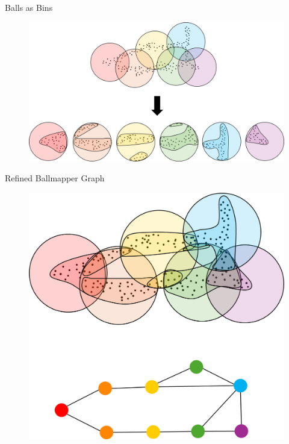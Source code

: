 \documentclass{beamer}
\begin{document}
\begin{frame}{Balls as Bins}
  \begin{figure}
    \begin{center}
      \hspace*{-.5cm}\includegraphics[width=1.1\textwidth]{ballclustering.png}
    \end{center}
  \end{figure}
\end{frame}

\begin{frame}{Refined Ballmapper Graph}
  \begin{figure}
    \begin{center}
      \includegraphics[width=.75\textwidth]{refinedballmapper.png}
    \end{center}
  \end{figure}
\end{frame}
\end{document}
